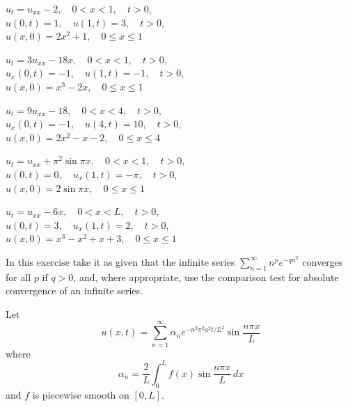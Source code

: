 \begin{exerciselist}
\item\label{exer:12.1.49}$u_t=u_{xx}-2,\quad 0<x<1,\quad t>0$,\\
$u(0,t)=1,\quad u(1,t)=3,\quad t>0$,\\
$u(x,0)=2x^2+1,\quad 0\le x\le 1$

\item\label{exer:12.1.50}$u_t=3u_{xx}-18x,\quad 0<x<1,\quad t>0$,\\
$u_x(0,t)=-1,\quad u(1,t)=-1,\quad t>0$,\\
$u(x,0)=x^3-2x,\quad 0\le x\le 1$

\item\label{exer:12.1.51}$u_t=9u_{xx}-18,\quad 0<x<4,\quad t>0$,\\
$u_x(0,t)=-1,\quad u(4,t)=10,\quad t>0$,\\
$u(x,0)=2x^2-x-2,\quad 0\le x\le 4$

\item\label{exer:12.1.52}$u_t=u_{xx}+\pi^2\sin\pi x,\quad 0<x<1,\quad t>0$,\\
$u(0,t)=0,\quad u_x(1,t)=-\pi,\quad t>0$,\\
$u(x,0)=2\sin\pi x,\quad 0\le x\le 1$

\item\label{exer:12.1.53}$u_t=u_{xx}-6x,\quad 0<x<L,\quad t>0$,\\
$u(0,t)=3,\quad u_x(1,t)=2,\quad t>0$,\\
$u(x,0)=x^3-x^2+x+3,\quad 0\le x\le 1$

\item\label{exer:12.1.54}In this exercise
take it as given that the infinite series $\sum_{n=1}^\infty
n^pe^{-qn^2}$ converges for all $p$ if $q>0$, and, where appropriate,
use the comparison test for absolute convergence of an infinite
series.

Let
\[
u(x,t)=\sum_{n=1}^\infty \alpha_n e^{-n^2\pi^2
a^2t/L^2}\sin\frac{n\pi x}{L}
\]
where
\[
\alpha_n=\frac{2}{L}\int_0^L f(x)\sin\frac{n\pi x}{L}\,dx
\]
and $f$ is piecewise smooth on $[0,L]$.




\end{exerciselist}
